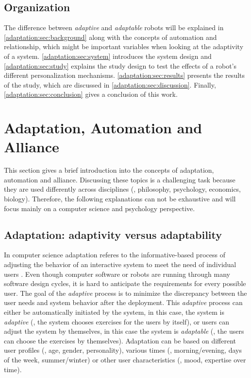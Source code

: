 \documentclass[twocolumn]{svjour3}          %
\begin{document}
\subsection{Organization}

The difference between \textit{adaptive} and \textit{adaptable} robots will be explained
in \autoref{adaptation:sec:background} along with the concepts of
automation and relationship, which might be important variables when
looking at the adaptivity of a system. \autoref{adaptation:sec:system}
introduces the system design and \ref{adaptation:sec:study} explains the
study design to test the effects of a robot's different personalization
mechanisms. \ref{adaptation:sec:results} presents the results of the
study, which are discussed in \ref{adaptation:sec:discussion}. Finally,
\ref{adaptation:sec:conclusion} gives a conclusion of this work.

\hypertarget{adaptation-automation-and-alliance}{%
\section{\texorpdfstring{Adaptation, Automation and Alliance
\label{adaptation:sec:background}}{Adaptation, Automation and Alliance }}\label{adaptation-automation-and-alliance}}

This section gives a brief introduction into the concepts of adaptation,
automation and alliance. Discussing these topics is a challenging task
because they are used differently across disciplines (\eg{}, philosophy,
psychology, economics, biology). Therefore, the following explanations
can not be exhaustive and will focus mainly on a computer science and
psychology perspective.

\hypertarget{adaptation-adaptivity-versus-adaptability}{%
\subsection{Adaptation: adaptivity versus
adaptability}\label{adaptation-adaptivity-versus-adaptability}}

In computer science adaptation referes to the informative-based process of adjusting the behavior of an interactive system to meet the need of individual users \cite{schneider1993adaptive}.
Even though computer software or robots are running through many
software design cycles, it is hard to anticipate the requirements for
every possible user. The goal of the \textit{adaptive} process is to minimize the
discrepancy between the user needs and system behavior after the
deployment. This \textit{adaptive} process can either be automatically initiated
by the system, in this case, the system is \textit{adaptive} (\eg{}, the system
chooses exercises for the users by itself), or users can adjust the
system by themselves, in this case the system is \textit{adaptable} (\eg{}, the
users can choose the exercises by themselves). Adaptation can be based
on different user profiles (\eg{}, age, gender, personality), various
times (\eg{}, morning/evening, days of the week, summer/winter) or other
user characteristics (\eg{}, mood, expertise over time).
\end{document}
